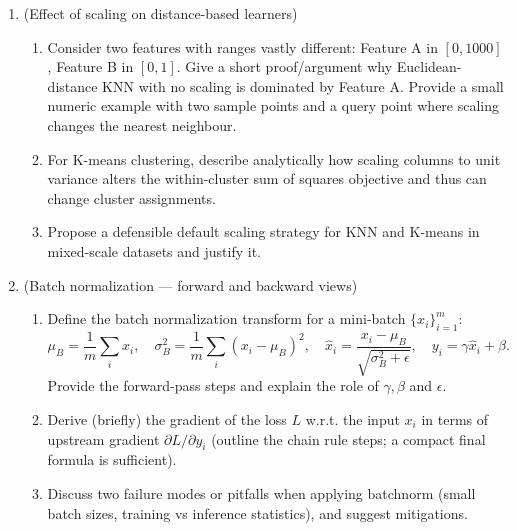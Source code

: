 \documentclass[12pt,a4paper]{article}
\begin{document}
\begin{enumerate}[label=(\arabic*)]
\item (Effect of scaling on distance-based learners)
    \begin{enumerate}[label=(\alph*)]
    \item Consider two features with ranges vastly different: Feature A in \([0,1000]\), Feature B in \([0,1]\). Give a short proof/argument why Euclidean-distance KNN with no scaling is dominated by Feature A. Provide a small numeric example with two sample points and a query point where scaling changes the nearest neighbour.
    \item For K-means clustering, describe analytically how scaling columns to unit variance alters the within-cluster sum of squares objective and thus can change cluster assignments.
    \item Propose a defensible default scaling strategy for KNN and K-means in mixed-scale datasets and justify it.
    \end{enumerate}

\item (Batch normalization — forward and backward views)
    \begin{enumerate}[label=(\alph*)]
    \item Define the batch normalization transform for a mini-batch \(\{x_i\}_{i=1}^m\):
    \[\mu_B=\frac{1}{m}\sum_i x_i,\quad\sigma_B^2=\frac{1}{m}\sum_i (x_i-\mu_B)^2,\quad \hat x_i=\frac{x_i-\mu_B}{\sqrt{\sigma_B^2+\epsilon}},\quad y_i=\gamma\hat x_i+\beta.
    \]
    Provide the forward-pass steps and explain the role of \(\gamma,\beta\) and \(\epsilon\).
    \item Derive (briefly) the gradient of the loss \(L\) w.r.t. the input \(x_i\) in terms of upstream gradient \(\partial L/\partial y_i\) (outline the chain rule steps; a compact final formula is sufficient).
    \item Discuss two failure modes or pitfalls when applying batchnorm (small batch sizes, training vs inference statistics), and suggest mitigations.
    \end{enumerate}


\end{enumerate}
\end{document}
